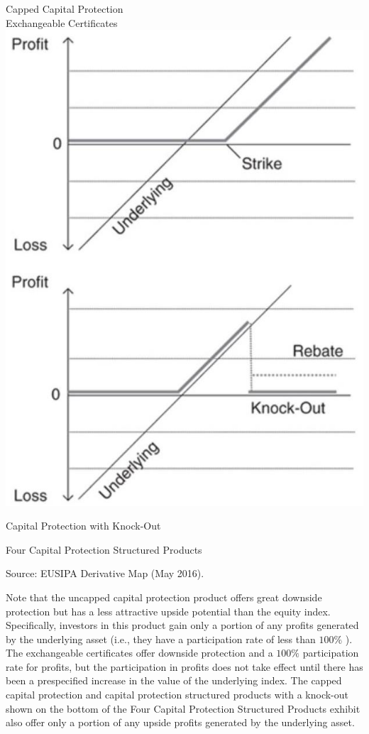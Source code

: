 \documentclass[11pt]{article}
\begin{document}
Capped Capital Protection\\
Exchangeable Certificates\\
\includegraphics[max width=\textwidth, center]{2024_04_10_b75ef470ae043c0f718dg-2}

Capital Protection with Knock-Out

Four Capital Protection Structured Products

Source: EUSIPA Derivative Map (May 2016).

Note that the uncapped capital protection product offers great downside protection but has a less attractive upside potential than the equity index. Specifically, investors in this product gain only a portion of any profits generated by the underlying asset (i.e., they have a participation rate of less than $100 \%$ ). The exchangeable certificates offer downside protection and a $100 \%$ participation rate for profits, but the participation in profits does not take effect until there has been a prespecified increase in the value of the underlying index. The capped capital protection and capital protection structured products with a knock-out shown on the bottom of the Four Capital Protection Structured Products exhibit also offer only a portion of any upside profits generated by the underlying asset.
\end{document}
